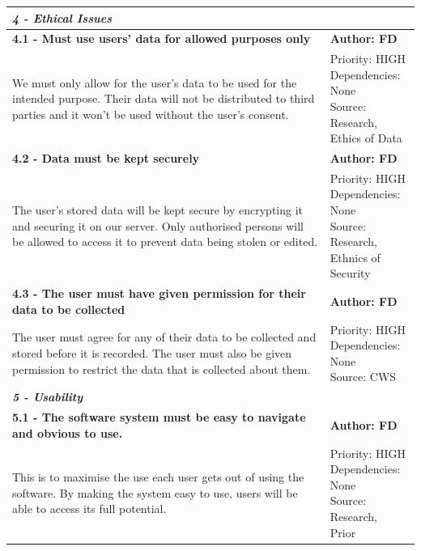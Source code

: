 \documentclass[10pt, notitlepage]{report}
\begin{document}
\begin{center}
\begin{longtable}{| p{13cm} | p{3cm} |}
\multicolumn{2}{|l|}{\textbf{\textit{4 - Ethical Issues}}} \\
\hline
\textbf{4.1 - Must use users’ data for allowed purposes only} & \textbf{Author: FD} \\
\hline
We must only allow for the user’s data to be used for the intended purpose. Their data will not be distributed to third parties and it won’t be used without the user’s consent.&
\makecell{Priority: HIGH\\Dependencies: None\\Source: Research,\\Ethics of Data}\\
\hline
\textbf{4.2 - Data must be kept securely} & \textbf{Author: FD} \\
\hline
The user’s stored data will be kept secure by encrypting it and securing it on our server. Only authorised persons will be allowed to access it to prevent data being stolen or edited.&
\makecell{Priority: HIGH\\Dependencies: None\\Source: Research,\\Ethnics of Security}\\
\hline
\textbf{4.3 - The user must have given permission for their data to be collected} & \textbf{Author: FD} \\
\hline
The user must agree for any of their data to be collected and stored before it is recorded. The user must also be given permission to restrict the data that is collected about them.&
\makecell{Priority: HIGH\\Dependencies: None\\Source: CWS}\\
\hline

\multicolumn{2}{|l|}{\textbf{\textit{5 - Usability}}} \\
\hline
\textbf{5.1 - The software system must be easy to navigate and obvious to use.} & \textbf{Author: FD} \\
\hline
This is to maximise the use each user gets out of using the software. By making  the system easy to use, users will be able to access its full potential.&
\makecell{Priority: HIGH\\Dependencies: None\\Source: Research,\\Prior}\\
\hline


\end{longtable}
\end{center}
\end{document}

